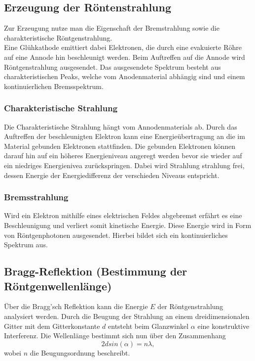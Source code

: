 \subsection{Erzeugung der Röntenstrahlung}
Zur Erzeugung nutze man die Eigenschaft der Bremstrahlung sowie die charakteristische
Röntgenstrahlung.\\ 
Eine Glühkathode emittiert dabei Elektronen, die durch eine evakuierte Röhre auf 
eine Annode hin beschleunigt werden. 
Beim Auftreffen auf die Annode wird Röntgenstrahlung ausgesendet.
Das ausgesendete Spektrum besteht aus charakteristischen Peaks, welche vom
Anodenmaterial abhängig sind und einem kontinuierlichen Bremsspektrum.

\subsubsection*{Charakteristische Strahlung}
Die Charakteristische Strahlung hängt vom Annodenmaterials ab. Durch das Auftreffen
der beschleunigten Elektron kann eine Energieübertragung an die im Material gebunden Elektronen stattfinden.
Die gebunden Elektronen können darauf hin auf ein höheres Energieniveau angeregt werden bevor 
sie wieder auf ein niedriges Energienivea zurückspringen. Dabei wird Strahlung strahlung frei,
dessen Energie der Energiedifferenz der verschieden Niveaus entspricht.

\subsubsection*{Bremsstrahlung}
Wird ein Elektron mithilfe eines elektrischen Feldes abgebremst erfährt es eine
Beschleunigung und verliert somit kinetische Energie. Diese Energie wird in Form von
Röntgenphotonen ausgesendet. Hierbei bildet sich ein kontinuierliches Spektrum aus.


\subsection{Bragg-Reflektion (Bestimmung der Röntgenwellenlänge)}
Über die Bragg'sch Reflektion kann die Energie $E$ der Röntgenstrahlung analysiert werden.
Durch die Beugung der Strahlung an einem dreidimensionalen Gitter mit dem Gitterkonstante $d$ 
entsteht beim Glanzwinkel $\alpha$ eine konstruktive Interferenz. Die Wellenlänge bestimmt 
sich nun über den Zusammenhang
\begin{equation}
    2 d sin(\alpha)=n \lambda,
    \label{eqn:bragg}
\end{equation}
wobei $n$ die Beugungsordnung beschreibt.
\label{sub:bragg}

